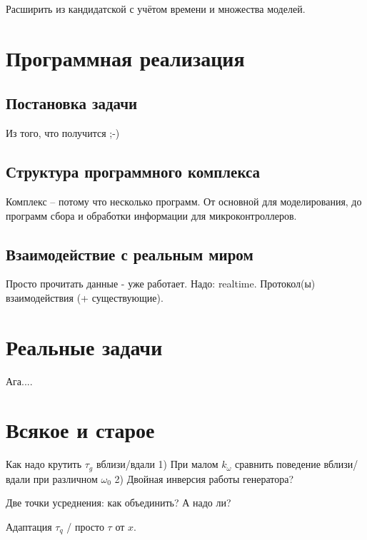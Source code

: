 \documentclass[a4paper,12pt]{article}
\begin{document}
Расширить из кандидатской с учётом времени и множества моделей.



\section{Программная реализация}

\subsection{Постановка задачи}

Из того, что получится ;-)

\subsection{Структура программного комплекса}

Комплекс -- потому что несколько программ.
От основной для моделирования, до программ сбора и обработки
информации для микроконтроллеров.

\subsection{Взаимодействие с реальным миром}

Просто прочитать данные - уже работает.
Надо: realtime.
Протокол(ы) взаимодействия (+ существующие).


\section{Реальные задачи}

Ага....


\section{Всякое и старое}



Как надо крутить $\tau_g$ вблизи/вдали
 1) При малом $k_\omega$ сравнить поведение вблизи/вдали при различном $\omega_0$
 2) Двойная инверсия работы генератора?

Две точки усреднения: как объединить? А надо ли?

Адаптация $\tau_q$ / просто $\tau$ от $x$.
\end{document}
